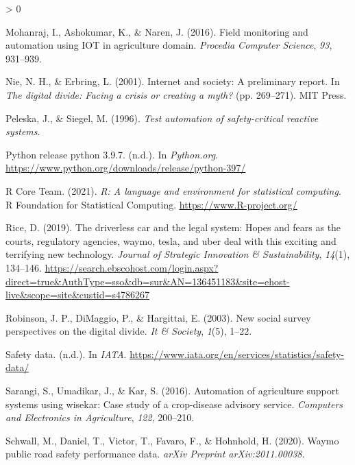 \documentclass[
  english,
  man]{apa7}
\newlength{\cslhangindent}
\newenvironment{CSLReferences}[2] %
 {%
  \setlength{\parindent}{0pt}
  \ifodd #1 \everypar{\setlength{\hangindent}{\cslhangindent}}\ignorespaces\fi
  \ifnum #2 > 0
  \setlength{\parskip}{#2\baselineskip}
  \fi
 }%
 {}
\begin{document}
\begin{CSLReferences}{1}{0}
\leavevmode\hypertarget{ref-mohanraj2016field}{}%
Mohanraj, I., Ashokumar, K., \& Naren, J. (2016). Field monitoring and automation using IOT in agriculture domain. \emph{Procedia Computer Science}, \emph{93}, 931--939.

\leavevmode\hypertarget{ref-10.5555ux2f762625.762640}{}%
Nie, N. H., \& Erbring, L. (2001). Internet and society: A preliminary report. In \emph{The digital divide: Facing a crisis or creating a myth?} (pp. 269--271). MIT Press.

\leavevmode\hypertarget{ref-peleska1996test}{}%
Peleska, J., \& Siegel, M. (1996). \emph{Test automation of safety-critical reactive systems}.

\leavevmode\hypertarget{ref-python.org}{}%
Python release python 3.9.7. (n.d.). In \emph{Python.org}. \url{https://www.python.org/downloads/release/python-397/}

\leavevmode\hypertarget{ref-R-base}{}%
R Core Team. (2021). \emph{R: A language and environment for statistical computing}. R Foundation for Statistical Computing. \url{https://www.R-project.org/}

\leavevmode\hypertarget{ref-13645118320190101}{}%
Rice, D. (2019). The driverless car and the legal system: Hopes and fears as the courts, regulatory agencies, waymo, tesla, and uber deal with this exciting and terrifying new technology. \emph{Journal of Strategic Innovation \& Sustainability}, \emph{14}(1), 134--146. \url{https://search.ebscohost.com/login.aspx?direct=true\&AuthType=sso\&db=sur\&AN=136451183\&site=ehost-live\&scope=site\&custid=s4786267}

\leavevmode\hypertarget{ref-robinson2003new}{}%
Robinson, J. P., DiMaggio, P., \& Hargittai, E. (2003). New social survey perspectives on the digital divide. \emph{It \& Society}, \emph{1}(5), 1--22.

\leavevmode\hypertarget{ref-iata}{}%
Safety data. (n.d.). In \emph{IATA}. \url{https://www.iata.org/en/services/statistics/safety-data/}

\leavevmode\hypertarget{ref-sarangi2016automation}{}%
Sarangi, S., Umadikar, J., \& Kar, S. (2016). Automation of agriculture support systems using wisekar: Case study of a crop-disease advisory service. \emph{Computers and Electronics in Agriculture}, \emph{122}, 200--210.

\leavevmode\hypertarget{ref-schwall2020waymo}{}%
Schwall, M., Daniel, T., Victor, T., Favaro, F., \& Hohnhold, H. (2020). Waymo public road safety performance data. \emph{arXiv Preprint arXiv:2011.00038}.


\end{CSLReferences}
\end{document}

